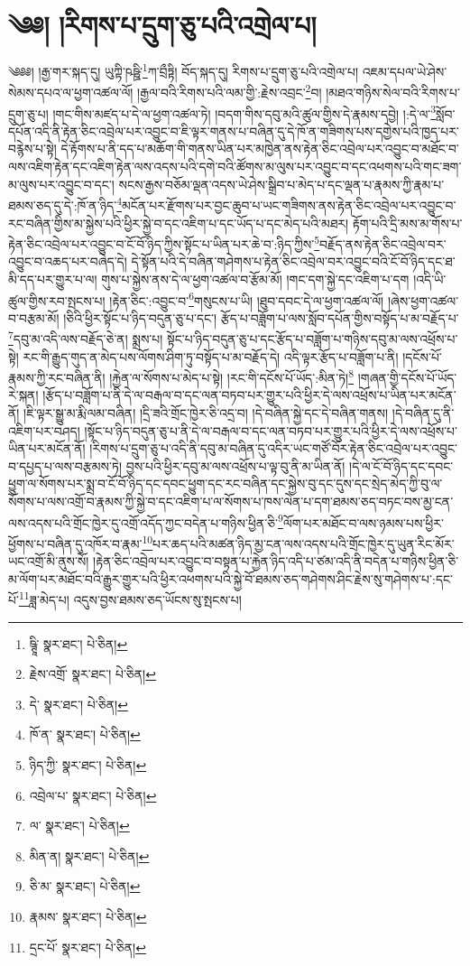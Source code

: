 \setcounter{footnote}{0} 
\chapter{༄༅། །རིགས་པ་དྲུག་ཅུ་པའི་འགྲེལ་པ།}༄༅༅། །རྒྱ་གར་སྐད་དུ། ཡུཀྟི་ཥཥྛི་\footnote{ཥྚཱི་  སྣར་ཐང་།  པེ་ཅིན། }ཀ་བྲྀཏྟི། བོད་སྐད་དུ། རིགས་པ་དྲུག་ཅུ་པའི་འགྲེལ་པ། འཇམ་དཔལ་ཡེ་ཤེས་སེམས་དཔའ་ལ་ཕྱག་འཚལ་ལོ། །རྒྱལ་བའི་རིགས་པའི་ལམ་གྱི་:རྗེས་འབྲང་\footnote{རྗེས་འགྲོ་  སྣར་ཐང་།  པེ་ཅིན། }བ། །མཐའ་གཉིས་སེལ་བའི་རིགས་པ་དྲུག་ཅུ་པ། །གང་གིས་མཛད་པ་དེ་ལ་ཕྱག་འཚལ་ཏེ། །བདག་གིས་དབུ་མའི་ཚུལ་གྱིས་དེ་རྣམས་དབྱེ། །:དེ་ལ་\footnote{དེ་  སྣར་ཐང་།  པེ་ཅིན། }སློབ་དཔོན་འདི་ནི་རྟེན་ཅིང་འབྲེལ་པར་འབྱུང་བ་ཇི་ལྟར་གནས་པ་བཞིན་དུ་དེ་ཁོ་ན་གཟིགས་པས་དགྱེས་པའི་ཁྱད་པར་བརྙེས་པ་སྟེ། དེ་རྟོགས་པ་ནི་དད་པ་མཆོག་གི་གནས་ཡིན་པར་མཁྱེན་ནས་རྟེན་ཅིང་འབྲེལ་པར་འབྱུང་བ་མཐོང་བ་ལས་འཇིག་རྟེན་དང་འཇིག་རྟེན་ལས་འདས་པའི་དགེ་བའི་ཚོགས་མ་ལུས་པར་འབྱུང་བ་དང་འཕགས་པའི་གང་ཟག་མ་ལུས་པར་འབྱུང་བ་དང་། སངས་རྒྱས་བཅོམ་ལྡན་འདས་ཡེ་ཤེས་སྒྲིབ་པ་མེད་པ་དང་ལྡན་པ་རྣམས་ཀྱི་རྣམ་པ་ཐམས་ཅད་དུ་དེ་:ཁོ་ན་ཉིད་\footnote{ཁོ་ན་  སྣར་ཐང་།  པེ་ཅིན། }མངོན་པར་རྫོགས་པར་བྱང་ཆུབ་པ་ཡང་གཟིགས་ནས་རྟེན་ཅིང་འབྲེལ་པར་འབྱུང་བ་རང་བཞིན་གྱིས་མ་སྐྱེས་པའི་ཕྱིར་སྐྱེ་བ་དང་འཇིག་པ་དང་ཡོད་པ་དང་མེད་པའི་མཐར། རྟོག་པའི་དྲི་མས་མ་གོས་པ་རྟེན་ཅིང་འབྲེལ་པར་འབྱུང་བ་ངོ་བོ་ཉིད་ཀྱིས་སྟོང་པ་ཡིན་པར་ཆེ་བ་:ཉིད་ཀྱིས་\footnote{ཉིད་ཀྱི་  སྣར་ཐང་།  པེ་ཅིན། }བརྗོད་ནས་རྟེན་ཅིང་འབྲེལ་བར་འབྱུང་བ་འཆད་པར་བཞེད་དེ། དེ་སྟོན་པའི་དེ་བཞིན་གཤེགས་པ་རྟེན་ཅིང་འབྲེལ་བར་འབྱུང་བའི་ངོ་བོ་ཉིད་དང་ཐ་མི་དད་པར་གྱུར་པ་ལ། གུས་པ་སྐྱེས་ནས་དེ་ལ་ཕྱག་འཚལ་བ་རྩོམ་མོ། །གང་དག་སྐྱེ་དང་འཇིག་པ་དག །འདི་ཡི་ཚུལ་གྱིས་རབ་སྤངས་པ། །རྟེན་ཅིང་:འབྱུང་བ་\footnote{འབྲེལ་པ་  སྣར་ཐང་།  པེ་ཅིན། }གསུངས་པ་ཡི། །ཐུབ་དབང་དེ་ལ་ཕྱག་འཚལ་ལོ། །ཞེས་ཕྱག་འཚལ་བ་བརྩམ་མོ། །ཅིའི་ཕྱིར་སྟོང་པ་ཉིད་བདུན་ཅུ་པ་དང་། རྩོད་པ་བཟློག་པ་ལས་སློབ་དཔོན་གྱིས་བསྟོད་པ་མ་བརྗོད་པ་\footnote{ལ་  སྣར་ཐང་།  པེ་ཅིན། }དབུ་མ་འདི་ལས་བརྗོད་ཅེ་ན། སྨྲས་པ། སྟོང་པ་ཉིད་བདུན་ཅུ་པ་དང་རྩོད་པ་བཟློག་པ་གཉིས་དབུ་མ་ལས་འཕྲོས་པ་སྟེ། རང་གི་རྒྱུད་གུད་ན་མེད་པས་ལོགས་ཤིག་ཏུ་བསྟོད་པ་མ་བརྗོད་དེ། འདི་ལྟར་རྩོད་པ་བཟློག་པ་ནི། །དངོས་པོ་རྣམས་ཀྱི་རང་བཞིན་ནི། །རྐྱེན་ལ་སོགས་པ་མེད་པ་སྟེ། །རང་གི་དངོས་པོ་ཡོད་:མིན་ཏེ།\footnote{མིན་ན།  སྣར་ཐང་།  པེ་ཅིན། } །གཞན་གྱི་དངོས་པོ་ཡོད་རེ་སྐན། །རྩོད་པ་བཟློག་པ་ནི་དེ་ལ་བརྒལ་བ་དང་ལན་བཏབ་པར་གྱུར་པའི་ཕྱིར་དེ་ལས་འཕྲོས་པ་ཡིན་པར་མངོན་ནོ། །ཇི་ལྟར་སྒྱུ་མ་རྨི་ལམ་བཞིན། །དྲི་ཟའི་གྲོང་ཁྱེར་ཅི་འདྲ་བ། །དེ་བཞིན་སྐྱེ་དང་དེ་བཞིན་གནས། །དེ་བཞིན་དུ་ནི་འཇིག་པར་བཤད། །སྟོང་པ་ཉིད་བདུན་ཅུ་པ་ནི་དེ་ལ་བརྒལ་བ་དང་ལན་བཏབ་པར་གྱུར་པའི་ཕྱིར་དེ་ལས་འཕྲོས་པ་ཡིན་པར་མངོན་ནོ། །རིགས་པ་དྲུག་ཅུ་པ་འདི་ནི་དབུ་མ་བཞིན་དུ་འདིར་ཡང་གཙོ་བོར་རྟེན་ཅིང་འབྲེལ་པར་འབྱུང་བ་དཔྱད་པ་ལས་བརྩམས་ཏེ། བྱས་པའི་ཕྱིར་དབུ་མ་ལས་འཕྲོས་པ་ལྟ་བུ་ནི་མ་ཡིན་ནོ། །དེ་ལ་ངོ་བོ་ཉིད་དང་དབང་ཕྱུག་ལ་སོགས་པར་སྨྲ་བ་ངོ་བོ་ཉིད་དང་དབང་ཕྱུག་དང་རང་བཞིན་དང་སྐྱེས་བུ་དང་དུས་དང་སྲེད་མེད་ཀྱི་བུ་ལ་སོགས་པ་ལས་འགྲོ་བ་རྣམས་ཀྱི་སྐྱེ་བ་དང་འཇིག་པ་ལ་སོགས་པ་ཁས་ལེན་པ་དག་ཐམས་ཅད་བཏང་བས་མྱ་ངན་ལས་འདས་པའི་གྲོང་ཁྱེར་དུ་འགྲོ་འདོད་ཀྱང་བདེན་པ་གཉིས་ཕྱིན་ཅི་\footnote{ཅི་མ་  སྣར་ཐང་།  པེ་ཅིན། }ལོག་པར་མཐོང་བ་ལས་ཉམས་པས་ཕྱིར་ཕྱོགས་པ་བཞིན་དུ་འཁོར་བ་རྣམ་\footnote{རྣམས་  སྣར་ཐང་།  པེ་ཅིན། }པར་ཆད་པའི་མཚན་ཉིད་མྱ་ངན་ལས་འདས་པའི་གྲོང་ཁྱེར་དུ་ཡུན་རིང་མོར་ཡང་འགྲོ་མི་ནུས་སོ། །རྟེན་ཅིང་འབྲེལ་པར་འབྱུང་བ་བསྟན་པ་རྐྱེན་ཉིད་འདི་པ་ཙམ་འདི་ནི་བདེན་པ་གཉིས་ཕྱིན་ཅི་མ་ལོག་པར་མཐོང་བའི་རྒྱུར་གྱུར་པའི་ཕྱིར་འཕགས་པའི་སྐྱེ་བོ་ཐམས་ཅད་གཤེགས་ཤིང་རྗེས་སུ་གཤེགས་པ་:དང་པོ་\footnote{དྲང་པོ་  སྣར་ཐང་།  པེ་ཅིན། }ཟླ་མེད་པ། འདུས་བྱས་ཐམས་ཅད་ཡོངས་སུ་སྤངས་པ། 